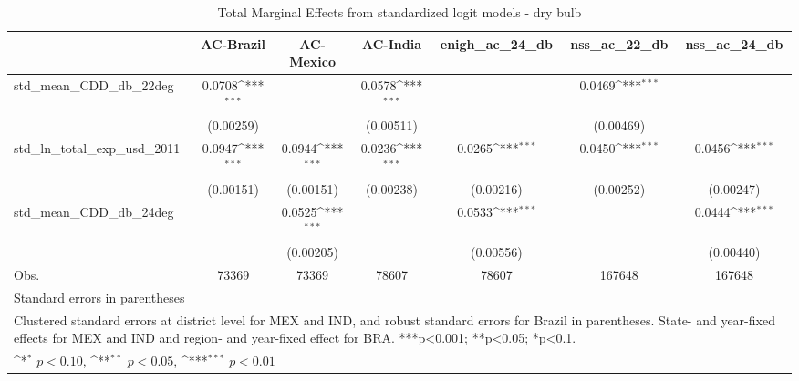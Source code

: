 \begin{table}[htbp]\centering
\def\sym#1{\ifmmode^{#1}\else\(^{#1}\)\fi}
\caption{Total Marginal Effects from standardized logit models - dry bulb}
\begin{tabular}{l*{6}{c}}
\hline\hline
            &\multicolumn{1}{c}{AC-Brazil}&\multicolumn{1}{c}{AC-Mexico}&\multicolumn{1}{c}{AC-India}&\multicolumn{1}{c}{enigh\_ac\_24\_db}&\multicolumn{1}{c}{nss\_ac\_22\_db}&\multicolumn{1}{c}{nss\_ac\_24\_db}\\
\hline
std\_mean\_CDD\_db\_22deg&      0.0708\sym{***}&                     &      0.0578\sym{***}&                     &      0.0469\sym{***}&                     \\
            &   (0.00259)         &                     &   (0.00511)         &                     &   (0.00469)         &                     \\
std\_ln\_total\_exp\_usd\_2011&      0.0947\sym{***}&      0.0944\sym{***}&      0.0236\sym{***}&      0.0265\sym{***}&      0.0450\sym{***}&      0.0456\sym{***}\\
            &   (0.00151)         &   (0.00151)         &   (0.00238)         &   (0.00216)         &   (0.00252)         &   (0.00247)         \\
std\_mean\_CDD\_db\_24deg&                     &      0.0525\sym{***}&                     &      0.0533\sym{***}&                     &      0.0444\sym{***}\\
            &                     &   (0.00205)         &                     &   (0.00556)         &                     &   (0.00440)         \\
\hline
Obs.        &       73369         &       73369         &       78607         &       78607         &      167648         &      167648         \\
\hline\hline
\multicolumn{7}{l}{\footnotesize Standard errors in parentheses}\\
\multicolumn{7}{l}{\footnotesize Clustered standard errors at district level for MEX and IND, and robust standard errors for Brazil in parentheses. State- and year-fixed effects for MEX and IND and region- and year-fixed effect for BRA. ***p<0.001; **p<0.05; *p<0.1.}\\
\multicolumn{7}{l}{\footnotesize \sym{*} \(p<0.10\), \sym{**} \(p<0.05\), \sym{***} \(p<0.01\)}\\
\end{tabular}
\end{table}
